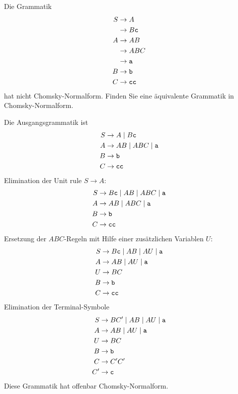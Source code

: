 Die Grammatik
\begin{align*}
S&\to A\\
 &\to B{\tt c}\\
A&\to AB\\
 &\to ABC\\
 &\to {\tt a}\\
B&\to {\tt b}\\
C&\to {\tt cc}
\end{align*}
hat nicht Chomsky-Normalform. Finden Sie eine äquivalente Grammatik
in Chomsky-Normalform.


\begin{loesung}
Die Ausgangsgrammatik ist
\begin{align*}
S&\to A\mid B{\tt c}\\
A&\to AB\mid ABC\mid {\tt a}\\
B&\to {\tt b}\\
C&\to {\tt cc}
\end{align*}
Elimination der Unit rule $S\to A$:
\begin{align*}
S&\to B{\tt c}\mid AB\mid ABC\mid {\tt a}\\
A&\to AB\mid ABC\mid {\tt a}\\
B&\to {\tt b}\\
C&\to {\tt cc}
\end{align*}
Ersetzung der $ABC$-Regeln mit Hilfe einer zusätzlichen
Variablen $U$:
\begin{align*}
S&\to B{\tt c}\mid AB\mid AU\mid {\tt a}\\
A&\to AB\mid AU\mid {\tt a}\\
U&\to BC\\
B&\to {\tt b}\\
C&\to {\tt cc}
\end{align*}
Elimination der Terminal-Symbole
\begin{align*}
S&\to BC'\mid AB\mid AU\mid {\tt a}\\
A&\to AB\mid AU\mid {\tt a}\\
U&\to BC\\
B&\to {\tt b}\\
C&\to C'C'\\
C'&\to {\tt c}
\end{align*}
Diese Grammatik hat offenbar Chomsky-Normalform.
\end{loesung}

